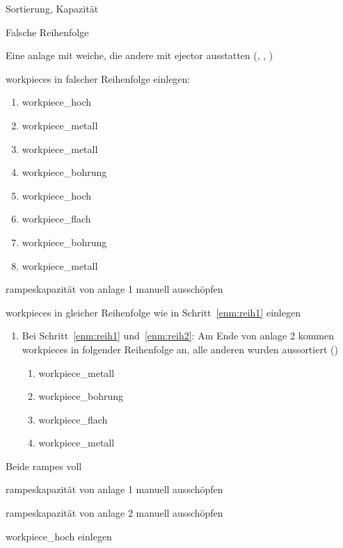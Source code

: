 \begin{abntest}{Sortierung, Kapazität}
    \begin{ablauf}{Falsche Reihenfolge}
        \item Eine \gls{anlage} mit \gls{weiche}, die andere mit \gls{ejector} ausstatten
        (, , )
        \item \Glspl{workpiece} in falscher Reihenfolge einlegen:\label{enm:reih1}
        \begin{enumerate}
            \item \gls{workpiece_hoch} %
            \item \gls{workpiece_metall}
            \item \gls{workpiece_metall} %
            \item \gls{workpiece_bohrung}
            \item \gls{workpiece_hoch} %
            \item \gls{workpiece_flach}
            \item \gls{workpiece_bohrung} %
            \item \gls{workpiece_metall}
        \end{enumerate}
        \item \Glspl{rampe}kapazität von \gls{anlage} 1 manuell ausschöpfen
        \item \Glspl{workpiece} in gleicher Reihenfolge wie in
        Schritt~\ref{enm:reih1} einlegen\label{enm:reih2}
    \end{ablauf}

    \erwartung
    \begin{enumerate}
        \item Bei Schritt~\ref{enm:reih1} und~\ref{enm:reih2}: Am Ende von \gls{anlage} 2 kommen
        \Glspl{workpiece} in folgender Reihenfolge an,
        alle anderen wurden aussortiert ()
        \begin{enumerate}
            \item \gls{workpiece_metall}
            \item \gls{workpiece_bohrung}
            \item \gls{workpiece_flach}
            \item \gls{workpiece_metall}
        \end{enumerate}
    \end{enumerate}

    \begin{ablauf}{Beide \glspl{rampe} voll}
        \item \Glspl{rampe}kapazität von \gls{anlage} 1 manuell ausschöpfen\label{enm:rampe1-voll}
        \item \Glspl{rampe}kapazität von \gls{anlage} 2 manuell ausschöpfen\label{enm:rampe2-voll}
        \item \gls{workpiece_hoch} einlegen\label{enm:beide-rutschen-voll-und-einlegen}
    \end{ablauf}


\end{abntest}
